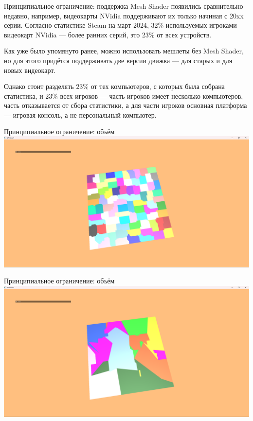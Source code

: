 \documentclass{beamer}
\begin{document}
    \begin{frame}{Принципиальное ограничение: поддержка}
        Mesh Shader появились сравнительно недавно,
        например, видеокарты NVidia поддерживают
        их только начиная с 20xx серии.
        Согласно статистике Steam на март 2024,
        32\% используемых игроками видеокарт NVidia
        --- более ранних серий,
        это 23\% от всех устройств.

        Как уже было упомянуто ранее,
        можно использовать мешлеты без Mesh Shader,
        но для этого придётся поддерживать две версии
        движка --- для старых и для новых видеокарт.

        \bigskip

        Однако стоит разделять
        23\% от тех компьютеров,
        с которых была собрана статистика,
        и 23\% всех игроков ---
        часть игроков имеет несколько компьютеров,
        часть отказывается от сбора статистики,
        а для части игроков основная платформа
        --- игровая консоль, а не персональный компьютер.
    \end{frame}

    \begin{frame}{Принципиальное ограничение: объём}
        \includegraphics[width=\textwidth]{plane0.png}
    \end{frame}

    \begin{frame}{Принципиальное ограничение: объём}
        \includegraphics[width=\textwidth]{plane1.png}
    \end{frame}
\end{document}
